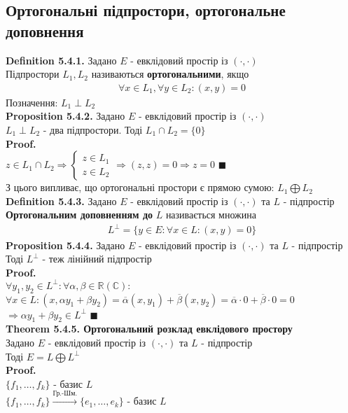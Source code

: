 \documentclass[a4paper, 14pt]{extarticle}
\def\defin#1{\textbf{Definition {#1}}}
\def\prp#1{\textbf{Proposition {#1}}}
\def\th#1{\textbf{Theorem {#1}}}
\def\proof{\textbf{Proof.}\\}
\def\bigline{\vspace{5mm}\\}
\def\qed{$\blacksquare$}
\begin{document}
\subsection{Ортогональні підпростори, ортогональне доповнення}
\defin{5.4.1.} Задано $E$ - евклідовий простір із $(\cdot, \cdot)$\\
Підпростори $L_1,L_2$ називаються \textbf{ортогональними}, якщо
\begin{align*}
\forall x \in L_1, \forall y \in L_2: (x,y) = 0
\end{align*}
Позначення: $L_1 \perp L_2$
\bigline
\prp{5.4.2.} Задано $E$ - евклідовий простір із $(\cdot, \cdot)$\\
$L_1 \perp L_2$ - два підпростори. Тоді $L_1 \cap L_2 = \{0\}$\\
\proof
$z \in L_1 \cap L_2 \Rightarrow \begin{cases} z \in L_1 \\ z \in L_2 \end{cases} \Rightarrow (z,z) = 0 \Rightarrow z = 0$ \qed \\
З цього випливає, що ортогональні простори є прямою сумою: $L_1 \bigoplus L_2$
\bigline
\defin{5.4.3.} Задано $E$ - евклідовий простір із $(\cdot, \cdot)$ та $L$ - підпростір\\
\textbf{Ортогональним доповненням до} $L$ називається множина
\begin{align*}
L^{\perp} = \{y \in E: \forall x \in L: (x,y) = 0\}
\end{align*}
\prp{5.4.4.} Задано $E$ - евклідовий простір із $(\cdot, \cdot)$ та $L$ - підпростір\\
Тоді $L^{\perp}$ - теж лінійний підпростір\\
\proof
$\forall y_1,y_2 \in L^{\perp}: \forall \alpha,\beta \in \mathbb{R} (\mathbb{C}):$\\
$\forall x \in L: (x, \alpha y_1+ \beta y_2) = \overline{\alpha} (x,y_1) + \overline{\beta} (x,y_2) = \overline{\alpha} \cdot 0 + \overline{\beta} \cdot 0 = 0$\\
$\Rightarrow \alpha y_1 + \beta y_2 \in L^{\perp}$ \qed
\bigline
\th{5.4.5. Ортогональний розклад евклідового простору}\\
Задано $E$ - евклідовий простір із $(\cdot, \cdot)$ та $L$ - підпростір\\
Тоді $E = L \bigoplus L^{\perp}$\\
\proof
$\{f_1,\dots,f_k\}$ - базис $L$\\
$\{f_1,\dots,f_k\} \overset{\textrm{Гр.-Шм.}}{\rightarrow} \{e_1,\dots,e_k\}$ - базис $L$\\
\end{document}
